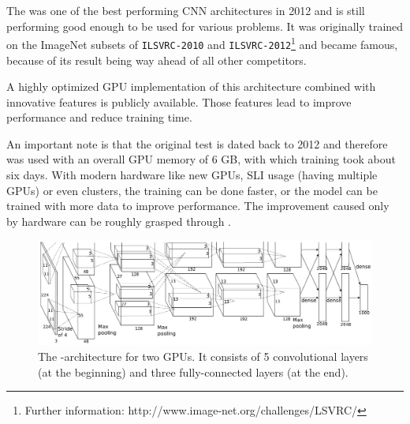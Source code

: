 The \textit{\alexnet} was one of the best performing CNN architectures in 2012 and is still performing good enough to be used for various problems. It was originally trained on the ImageNet subsets of \texttt{ILSVRC-2010} and \texttt{ILSVRC-2012}\footnote{Further information: http://www.image-net.org/challenges/LSVRC/} and became famous, because of its result being way ahead of all other competitors.

A highly optimized GPU implementation of this architecture combined with innovative features is publicly available. Those features lead to improve performance and reduce training time.\cite{krizhevsky2012imagenet}

An important note is that the original test is dated back to 2012 and therefore was used with an overall GPU memory of 6 GB, with which training took about six days. With modern hardware like new GPUs, SLI usage (having multiple GPUs) or even clusters, the training can be done faster, or the model can be trained with more data to improve performance. The improvement caused only by hardware can be roughly grasped through \cite{sze2017hardware}.


\begin{figure}[ht]
	\centering
	\includegraphics[scale = 0.45]{src/pic/AlexNet-structure.PNG}
	\caption{The \alexnet-architecture for two GPUs. It consists of 5 convolutional layers (at the beginning) and three fully-connected layers (at the end). 
	\cite{krizhevsky2012imagenet}}
	\label{pic: AlexNet}
\end{figure}